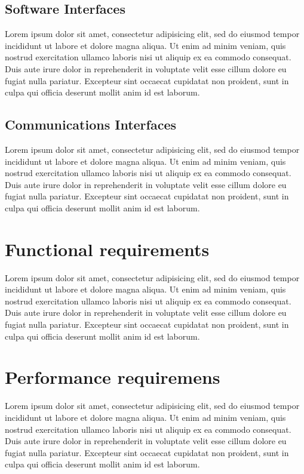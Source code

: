 \documentclass[10pt,a4paper]{report}
\begin{document}
	\subsection{Software Interfaces}
	Lorem ipsum dolor sit amet, consectetur adipisicing elit, sed do eiusmod
	tempor incididunt ut labore et dolore magna aliqua. Ut enim ad minim veniam,
	quis nostrud exercitation ullamco laboris nisi ut aliquip ex ea commodo
	consequat. Duis aute irure dolor in reprehenderit in voluptate velit esse
	cillum dolore eu fugiat nulla pariatur. Excepteur sint occaecat cupidatat non
	proident, sunt in culpa qui officia deserunt mollit anim id est laborum.
	
	\subsection{Communications Interfaces}
	Lorem ipsum dolor sit amet, consectetur adipisicing elit, sed do eiusmod
	tempor incididunt ut labore et dolore magna aliqua. Ut enim ad minim veniam,
	quis nostrud exercitation ullamco laboris nisi ut aliquip ex ea commodo
	consequat. Duis aute irure dolor in reprehenderit in voluptate velit esse
	cillum dolore eu fugiat nulla pariatur. Excepteur sint occaecat cupidatat non
	proident, sunt in culpa qui officia deserunt mollit anim id est laborum.
	
	\section{Functional requirements}
	Lorem ipsum dolor sit amet, consectetur adipisicing elit, sed do eiusmod
	tempor incididunt ut labore et dolore magna aliqua. Ut enim ad minim veniam,
	quis nostrud exercitation ullamco laboris nisi ut aliquip ex ea commodo
	consequat. Duis aute irure dolor in reprehenderit in voluptate velit esse
	cillum dolore eu fugiat nulla pariatur. Excepteur sint occaecat cupidatat non
	proident, sunt in culpa qui officia deserunt mollit anim id est laborum.
	
	\section{Performance requiremens}
	Lorem ipsum dolor sit amet, consectetur adipisicing elit, sed do eiusmod
	tempor incididunt ut labore et dolore magna aliqua. Ut enim ad minim veniam,
	quis nostrud exercitation ullamco laboris nisi ut aliquip ex ea commodo
	consequat. Duis aute irure dolor in reprehenderit in voluptate velit esse
	cillum dolore eu fugiat nulla pariatur. Excepteur sint occaecat cupidatat non
	proident, sunt in culpa qui officia deserunt mollit anim id est laborum.
	
\end{document}
